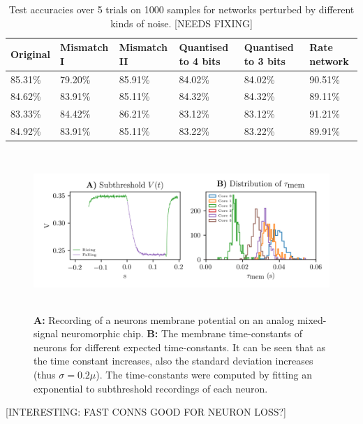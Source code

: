 \documentclass[twoside,11pt,titlepage]{article}
\begin{document}
\begin{table}[!htb]
  \begin{adjustbox}{center}
  \begin{tabular}{|l|l|l|l|l|l|}
  \hline
  {Original} & {Mismatch I} & {Mismatch II} & {Quantised to 4 bits} & {Quantised to 3 bits} & {Rate network} \\
  \hline
  {85.31\%}  & {79.20\%}    & {85.91\%}     & {84.02\%}             & {84.02\%}             & {90.51\%}      \\
  {84.62\%}  & {83.91\%}    & {85.11\%}     & {84.32\%}             & {84.32\%}             & {89.11\%}      \\
  {83.33\%}  & {84.42\%}    & {86.21\%}     & {83.12\%}             & {83.12\%}             & {91.21\%}      \\
  {84.92\%}  & {83.91\%}    & {85.11\%}     & {83.22\%}             & {83.22\%}             & {89.91\%}      \\
  \hline
  \end{tabular}
\end{adjustbox}
\caption{Test accuracies over 5 trials on 1000 samples for networks perturbed by different kinds of noise. [NEEDS FIXING]}
\label{table:table1}
\end{table}

\begin{figure}[!htb]
  \includegraphics[width = \columnwidth, height=6cm]{figures/figure5.png}
  \caption{\textbf{A:} Recording of a neurons membrane potential on an analog mixed-signal neuromorphic chip. \textbf{B:} The membrane time-constants of neurons for different expected time-constants.
  It can be seen that as the time constant increases, also the standard deviation increases (thus $\sigma=0.2\mu$).
  The time-constants were computed by fitting an exponential to subthreshold recordings of each neuron.}
  \label{fig:figure5}
\end{figure}

[INTERESTING: FAST CONNS GOOD FOR NEURON LOSS?]

\clearpage

\vskip 0.2in

\end{document}
